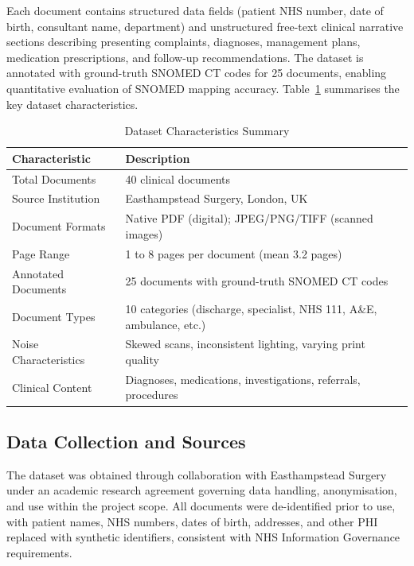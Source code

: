 Each document contains structured data fields (patient NHS number, date of birth, consultant name, department) and unstructured free-text clinical narrative sections describing presenting complaints, diagnoses, management plans, medication prescriptions, and follow-up recommendations. The dataset is annotated with ground-truth SNOMED CT codes for 25 documents, enabling quantitative evaluation of SNOMED mapping accuracy. Table~\ref{tab:dataset_characteristics} summarises the key dataset characteristics.

\begin{table}[htbp]
\centering
\caption{Dataset Characteristics Summary}
\label{tab:dataset_characteristics}
\begin{tabular}{|p{4.5cm}|p{10cm}|}
\hline
\textbf{Characteristic} & \textbf{Description} \\
\hline
Total Documents & 40 clinical documents \\
\hline
Source Institution & Easthampstead Surgery, London, UK \\
\hline
Document Formats & Native PDF (digital); JPEG/PNG/TIFF (scanned images) \\
\hline
Page Range & 1 to 8 pages per document (mean 3.2 pages) \\
\hline
Annotated Documents & 25 documents with ground-truth SNOMED CT codes \\
\hline
Document Types & 10 categories (discharge, specialist, NHS 111, A\&E, ambulance, etc.) \\
\hline
Noise Characteristics & Skewed scans, inconsistent lighting, varying print quality \\
\hline
Clinical Content & Diagnoses, medications, investigations, referrals, procedures \\
\hline
\end{tabular}
\end{table}

\subsection{Data Collection and Sources}
The dataset was obtained through collaboration with Easthampstead Surgery under an academic research agreement governing data handling, anonymisation, and use within the project scope. All documents were de-identified prior to use, with patient names, NHS numbers, dates of birth, addresses, and other PHI replaced with synthetic identifiers, consistent with NHS Information Governance requirements.

